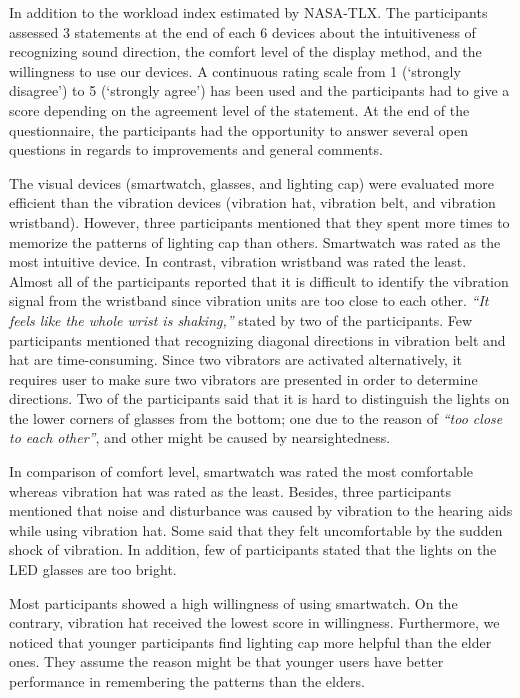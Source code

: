 \documentclass{sigchi}
\begin{document}
In addition to the workload index estimated by NASA-TLX. The participants assessed 3 statements at the end of each 6 devices about the intuitiveness of recognizing sound direction, the comfort level of the display method, and the willingness to use our devices. %
A continuous rating scale from 1 (\textquoteleft strongly disagree\textquoteright) to 5 (\textquoteleft strongly agree\textquoteright) has been used and the participants had to give a score depending on the agreement level of the statement. At the end of the questionnaire, the participants had the opportunity to answer several open questions in regards to improvements and general comments.

The visual devices (smartwatch, glasses, and lighting cap) were evaluated more efficient than the vibration devices (vibration hat, vibration belt, and vibration wristband). However, three participants mentioned that they spent more times to memorize the patterns of lighting cap than others. Smartwatch was rated as the most intuitive device. In contrast, vibration wristband was rated the least. Almost all of the participants reported that it is difficult to identify the vibration signal from the wristband since vibration units are too close to each other. \textit{\textquotedblleft It feels like the whole wrist is shaking,\textquotedblright} stated by two of the participants. Few participants mentioned that recognizing diagonal directions in vibration belt and hat are time-consuming. Since two vibrators are activated alternatively, it requires user to make sure two vibrators are presented in order to determine directions. Two of the participants said that it is hard to distinguish the lights on the lower corners of glasses from the bottom; one due to the reason of \textit{\textquotedblleft too close to each other\textquotedblright}, and other might be caused by nearsightedness.

In comparison of comfort level, smartwatch was rated the most comfortable whereas vibration hat was rated as the least. Besides, three participants mentioned that noise and disturbance was caused by vibration to the hearing aids while using vibration hat. Some said that they felt uncomfortable by the sudden shock of vibration. In addition, few of participants stated that the lights on the LED glasses are too bright.

Most participants showed a high willingness of using smartwatch. On the contrary, vibration hat received the lowest score in willingness. Furthermore, we noticed that younger participants find lighting cap more helpful than the elder ones. They assume the reason might be that younger users have better performance in remembering the patterns than the elders.
\end{document}
